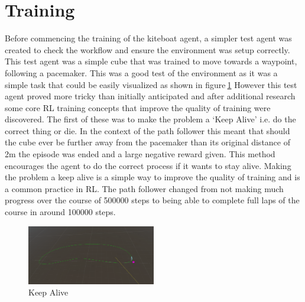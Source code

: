 \section{Training}\label{sec:training}
Before commencing the training of the kiteboat agent, a simpler test agent was created to check the workflow and ensure the environment was setup correctly. This test agent was a simple cube that was trained to move towards a waypoint, following a pacemaker. This was a good test of the environment as it was a simple task that could be easily visualized as shown in figure$~$\ref{pathFollower} However this test agent proved more tricky than initially anticipated and after additional research some core RL training concepts that improve the quality of training were discovered. The first of these was to make the problem a `Keep Alive' i.e. do the correct thing or die. In the context of the path follower this meant that should the cube ever be further away from the pacemaker than its original distance of 2m the episode was ended and a large negative reward given. This method encourages the agent to do the correct process if it wants to stay alive. Making the problem a keep alive is a simple way to improve the quality of training and is a common practice in RL. The path follower changed from not making much progress over the course of 500000 steps to being able to complete full laps of the course in around 100000 steps.

\begin{figure}[h]
    \centering
    \includegraphics[width=0.5\textwidth]{Images/practiceTraining.png}
    \caption{Keep Alive}\label{pathFollower}
\end{figure}

